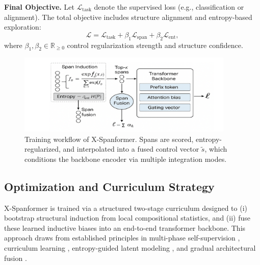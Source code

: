 \noindent\textbf{Final Objective.} Let \(\mathcal{L}_{\mathrm{task}}\) denote the supervised loss (e.g., classification or alignment). The total objective includes structure alignment and entropy-based exploration:
\[
\mathcal{L} = \mathcal{L}_{\mathrm{task}} + \beta_1 \mathcal{L}_{\mathrm{span}} + \beta_2 \mathcal{L}_{\mathrm{ent}},
\]
where \(\beta_1, \beta_2 \in \mathbb{R}_{\ge 0}\) control regularization strength and structure confidence.


\vspace{1.5em}
\begin{figure}[H]
  \centering
  \includegraphics[width=0.92\textwidth]{figures/figure_3.png}
  \caption{Training workflow of X-Spanformer. Spans are scored, entropy-regularized, and interpolated into a fused control vector \(\tilde{s}\), which conditions the backbone encoder via multiple integration modes.}
  \label{fig:training_workflow}
\end{figure}

\subsection{Optimization and Curriculum Strategy}
\label{sec:optimization}

X-Spanformer is trained via a structured two-stage curriculum designed to (i) bootstrap structural induction from local compositional statistics, and (ii) fuse these learned inductive biases into an end-to-end transformer backbone. This approach draws from established principles in multi-phase self-supervision \cite{devlin2019bert, lee2019latent}, curriculum learning \cite{bengio2009curriculum, kreutzer2021distilling}, entropy-guided latent modeling \cite{kim2019unsupervised}, and gradual architectural fusion \cite{liu2018generating, lewis2020pretrained}.

